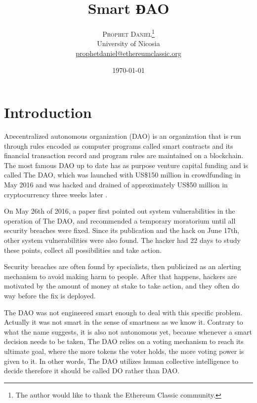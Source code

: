 \documentclass[twoside,twocolumn]{article}
\title{Smart ƉAO} %
\author{%
\textsc{Prophet Daniel}\thanks{The author would like to thank the Ethereum Classic community.} \\[1ex] %
\normalsize University of Nicosia \\ %
\normalsize \href{mailto:prophetdaniel@ethereumclassic.org}{prophetdaniel@ethereumclassic.org} %
}
\date{\today} %
\begin{document}
\maketitle


\section{Introduction}

\lettrine[nindent=0em,lines=3]{A} decentralized autonomous organization (DAO) is an organization that is run through rules encoded as computer programs called smart contracts and its financial transaction record and program rules are maintained on a blockchain.
The most famous DAO up to date has as purpose venture capital funding and is called The DAO, which was launched with US\$150 million in crowdfunding in May 2016 and was hacked and drained of approximately US\$50 million in cryptocurrency three weeks later \cite{Price2016}.\par 
On May 26th of 2016, a paper\cite{Popper2016} first pointed out system vulnerabilities in the operation of The DAO, and recommended a temporary moratorium until all security breaches were fixed. Since its publication and the hack on June 17th, other system vulnerabilities were also found. The hacker had 22 days to study these points, collect all possibilities and take action.\par
Security breaches are often found by specialists\cite{Perlroth2014}, then publicized as an alerting mechanism to avoid making harm to people. After that happens, hackers are motivated by the amount of money at stake to take action, and they often do way before the fix is deployed.\par
The DAO was not engineered smart enough to deal with this specific problem. Actually it was not smart in the sense of smartness as we know it. Contrary to what the name suggests, it is also not autonomous yet, because whenever a smart decision needs to be taken, The DAO relies on a voting mechanism to reach its ultimate goal, where the more tokens the voter holds, the more voting power is given to it. In other words, The DAO utilizes human collective intelligence to decide therefore it should be called DO rather than DAO.

\end{document}
